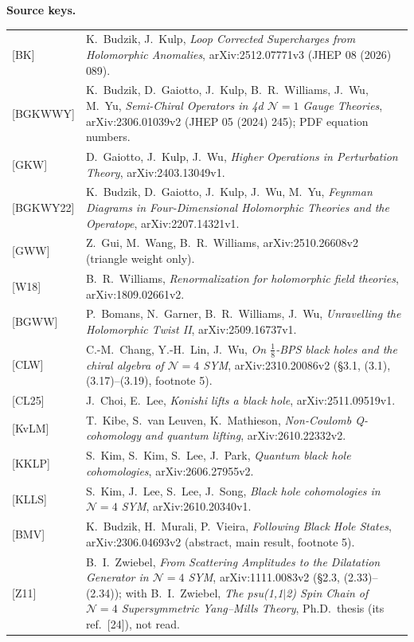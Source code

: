 \documentclass[11pt]{article}
\theoremstyle{definition}
\begin{document}
\textbf{Source keys.}
\begin{longtable}{p{2.3cm}p{13.7cm}}
{[BK]} & K.~Budzik, J.~Kulp, \emph{Loop Corrected Supercharges from Holomorphic Anomalies}, arXiv:2512.07771v3 (JHEP 08 (2026) 089).\\
{[BGKWWY]} & K.~Budzik, D.~Gaiotto, J.~Kulp, B.~R.~Williams, J.~Wu, M.~Yu, \emph{Semi-Chiral Operators in 4d $\mathcal N=1$ Gauge Theories}, arXiv:2306.01039v2 (JHEP 05 (2024) 245); PDF equation numbers.\\
{[GKW]} & D.~Gaiotto, J.~Kulp, J.~Wu, \emph{Higher Operations in Perturbation Theory}, arXiv:2403.13049v1.\\
{[BGKWY22]} & K.~Budzik, D.~Gaiotto, J.~Kulp, J.~Wu, M.~Yu, \emph{Feynman Diagrams in Four-Dimensional Holomorphic Theories and the Operatope}, arXiv:2207.14321v1.\\
{[GWW]} & Z.~Gui, M.~Wang, B.~R.~Williams, arXiv:2510.26608v2 (triangle weight only).\\
{[W18]} & B.~R.~Williams, \emph{Renormalization for holomorphic field theories}, arXiv:1809.02661v2.\\
{[BGWW]} & P.~Bomans, N.~Garner, B.~R.~Williams, J.~Wu, \emph{Unravelling the Holomorphic Twist II}, arXiv:2509.16737v1.\\
{[CLW]} & C.-M.~Chang, Y.-H.~Lin, J.~Wu, \emph{On $\tfrac18$-BPS black holes and the chiral algebra of $\mathcal N=4$ SYM}, arXiv:2310.20086v2 (\S3.1, (3.1), (3.17)--(3.19), footnote 5).\\
{[CL25]} & J.~Choi, E.~Lee, \emph{Konishi lifts a black hole}, arXiv:2511.09519v1.\\
{[KvLM]} & T.~Kibe, S.~van Leuven, K.~Mathieson, \emph{Non-Coulomb Q-cohomology and quantum lifting}, arXiv:2610.22332v2.\\
{[KKLP]} & S.~Kim, S.~Kim, S.~Lee, J.~Park, \emph{Quantum black hole cohomologies}, arXiv:2606.27955v2.\\
{[KLLS]} & S.~Kim, J.~Lee, S.~Lee, J.~Song, \emph{Black hole cohomologies in $\mathcal N=4$ SYM}, arXiv:2610.20340v1.\\
{[BMV]} & K.~Budzik, H.~Murali, P.~Vieira, \emph{Following Black Hole States}, arXiv:2306.04693v2 (abstract, main result, footnote 5).\\
{[Z11]} & B.~I.~Zwiebel, \emph{From Scattering Amplitudes to the Dilatation Generator in $\mathcal N=4$ SYM}, arXiv:1111.0083v2 (\S2.3, (2.33)--(2.34)); with B.~I.~Zwiebel, \emph{The psu(1,1$|$2) Spin Chain of $\mathcal N=4$ Supersymmetric Yang--Mills Theory}, Ph.D.\ thesis (its ref.~[24]), not read.\\

\end{longtable}
\end{document}

